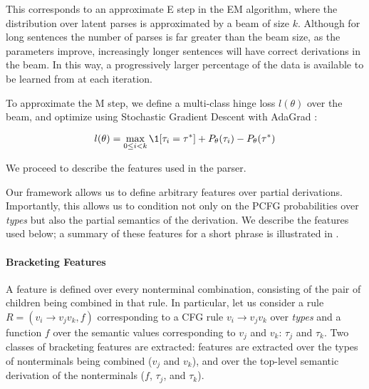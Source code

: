 This corresponds to an approximate E step in the EM algorithm, where the
  distribution over latent parses is approximated by a beam of size $k$.
Although for long sentences the number of parses is far greater than the
  beam size, as the parameters improve, increasingly longer sentences will
  have correct derivations in the beam.
In this way, a progressively larger percentage of the data is available to be
	learned from at each iteration.

To approximate the M step, 
  we define a multi-class hinge loss $l(\theta)$ over the beam, and
  optimize using Stochastic Gradient Descent with AdaGrad
  \cite{key:2010duchi-adagrad}:

\begin{equation}
l(\theta) = 
  \max_{0 \leq i < k} \1[\tau_i = \tau^*] + P_\theta(\tau_i)
                                                 - P_\theta(\tau^*)
\end{equation}

We proceed to describe the features used in the parser.


Our framework allows us to define arbitrary features over partial derivations.
Importantly, this allows us to condition not only on the PCFG probabilities
  over \textit{types} but also the partial semantics of the
  derivation.
We describe the features used below; a summary of these features
  for a short phrase is illustrated in .

\paragraph{Bracketing Features}
A feature is defined over every nonterminal combination,
  consisting of the pair of children being combined in that rule.
In particular, let us consider a rule
  \mbox{$R = (v_i \rightarrow v_j v_k, f)$} corresponding to a CFG rule
  \mbox{$v_i \rightarrow v_j v_k$} over \textit{types} and a function $f$
  over the semantic values corresponding to 
  $v_j$ and $v_k$: $\tau_j$ and $\tau_k$.
Two classes of bracketing features are extracted:
  features are extracted over the types of nonterminals being combined
    ($v_j$ and $v_k$),
  and over the top-level semantic derivation of the nonterminals
    ($f$, $\tau_j$, and $\tau_k$).

